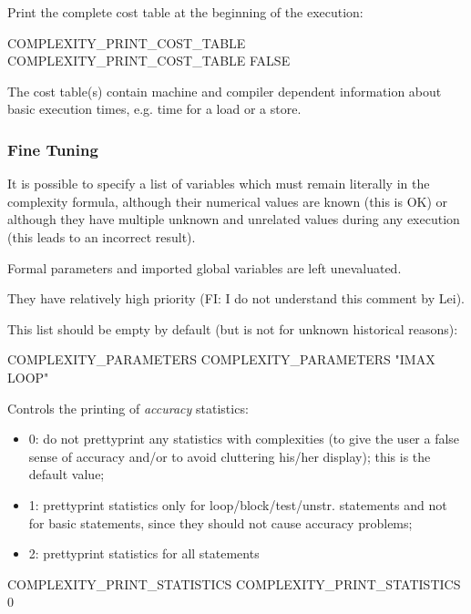 \documentclass[a4paper]{report}
\begin{document}
Print the complete cost table at the beginning of the execution:

\begin{PipsProp}{COMPLEXITY_PRINT_COST_TABLE}
COMPLEXITY_PRINT_COST_TABLE FALSE
\end{PipsProp}

The cost table(s) contain machine and compiler dependent information
about basic execution times, e.g. time for a load or a store.

\subsubsection{Fine Tuning}

It is possible to specify a list of variables which must remain
literally in the complexity formula, although their numerical values
are known (this is OK) or although they have multiple unknown and
unrelated values during any execution (this leads to an incorrect
result).

Formal parameters and imported global variables are left unevaluated.

They have relatively high priority (FI: I do not understand this comment
by Lei).

This list should be empty by default (but is not for unknown historical
reasons):

\begin{PipsProp}{COMPLEXITY_PARAMETERS}
COMPLEXITY_PARAMETERS "IMAX LOOP"
\end{PipsProp}

Controls the printing of {\em accuracy} statistics:

\begin{itemize}

  \item 0: do not prettyprint any statistics with complexities (to give
the user a false sense of accuracy and/or to avoid cluttering his/her
display); this is the default value;

  \item 1: prettyprint statistics only for loop/block/test/unstr.
statements and not for basic statements, since they should not cause
accuracy problems;

  \item 2: prettyprint statistics for all statements

\end{itemize}

\begin{PipsProp}{COMPLEXITY_PRINT_STATISTICS}
COMPLEXITY_PRINT_STATISTICS 0
\end{PipsProp}
\end{document}
